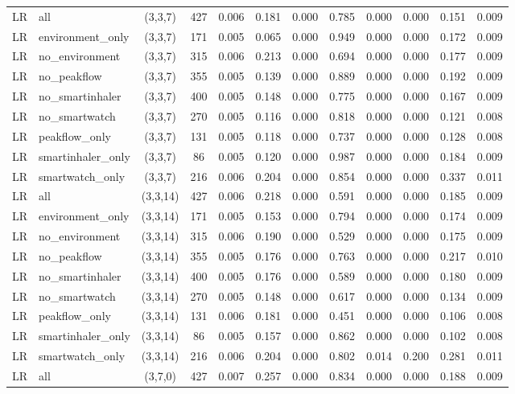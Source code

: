 \begin{longtable}{llcccccccccc}
LR & all & (3,3,7) & 427 & 0.006 & 0.181 & 0.000 & 0.785 & 0.000 & 0.000 & 0.151 & 0.009 \\
LR & environment\_only & (3,3,7) & 171 & 0.005 & 0.065 & 0.000 & 0.949 & 0.000 & 0.000 & 0.172 & 0.009 \\
LR & no\_environment & (3,3,7) & 315 & 0.006 & 0.213 & 0.000 & 0.694 & 0.000 & 0.000 & 0.177 & 0.009 \\
LR & no\_peakflow & (3,3,7) & 355 & 0.005 & 0.139 & 0.000 & 0.889 & 0.000 & 0.000 & 0.192 & 0.009 \\
LR & no\_smartinhaler & (3,3,7) & 400 & 0.005 & 0.148 & 0.000 & 0.775 & 0.000 & 0.000 & 0.167 & 0.009 \\
LR & no\_smartwatch & (3,3,7) & 270 & 0.005 & 0.116 & 0.000 & 0.818 & 0.000 & 0.000 & 0.121 & 0.008 \\
LR & peakflow\_only & (3,3,7) & 131 & 0.005 & 0.118 & 0.000 & 0.737 & 0.000 & 0.000 & 0.128 & 0.008 \\
LR & smartinhaler\_only & (3,3,7) & 86 & 0.005 & 0.120 & 0.000 & 0.987 & 0.000 & 0.000 & 0.184 & 0.009 \\
LR & smartwatch\_only & (3,3,7) & 216 & 0.006 & 0.204 & 0.000 & 0.854 & 0.000 & 0.000 & 0.337 & 0.011 \\
LR & all & (3,3,14) & 427 & 0.006 & 0.218 & 0.000 & 0.591 & 0.000 & 0.000 & 0.185 & 0.009 \\
LR & environment\_only & (3,3,14) & 171 & 0.005 & 0.153 & 0.000 & 0.794 & 0.000 & 0.000 & 0.174 & 0.009 \\
LR & no\_environment & (3,3,14) & 315 & 0.006 & 0.190 & 0.000 & 0.529 & 0.000 & 0.000 & 0.175 & 0.009 \\
LR & no\_peakflow & (3,3,14) & 355 & 0.005 & 0.176 & 0.000 & 0.763 & 0.000 & 0.000 & 0.217 & 0.010 \\
LR & no\_smartinhaler & (3,3,14) & 400 & 0.005 & 0.176 & 0.000 & 0.589 & 0.000 & 0.000 & 0.180 & 0.009 \\
LR & no\_smartwatch & (3,3,14) & 270 & 0.005 & 0.148 & 0.000 & 0.617 & 0.000 & 0.000 & 0.134 & 0.009 \\
LR & peakflow\_only & (3,3,14) & 131 & 0.006 & 0.181 & 0.000 & 0.451 & 0.000 & 0.000 & 0.106 & 0.008 \\
LR & smartinhaler\_only & (3,3,14) & 86 & 0.005 & 0.157 & 0.000 & 0.862 & 0.000 & 0.000 & 0.102 & 0.008 \\
LR & smartwatch\_only & (3,3,14) & 216 & 0.006 & 0.204 & 0.000 & 0.802 & 0.014 & 0.200 & 0.281 & 0.011 \\
LR & all & (3,7,0) & 427 & 0.007 & 0.257 & 0.000 & 0.834 & 0.000 & 0.000 & 0.188 & 0.009 \\

\end{longtable}

